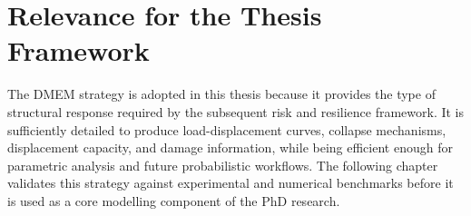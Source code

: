 \section{Relevance for the Thesis Framework}
\label{sec:dmem-framework-relevance}

The \gls{DMEM} strategy is adopted in this thesis because it provides the type of structural response required by the subsequent risk and resilience framework. It is sufficiently detailed to produce load-displacement curves, collapse mechanisms, displacement capacity, and damage information, while being efficient enough for parametric analysis and future probabilistic workflows. The following chapter validates this strategy against experimental and numerical benchmarks before it is used as a core modelling component of the PhD research.
